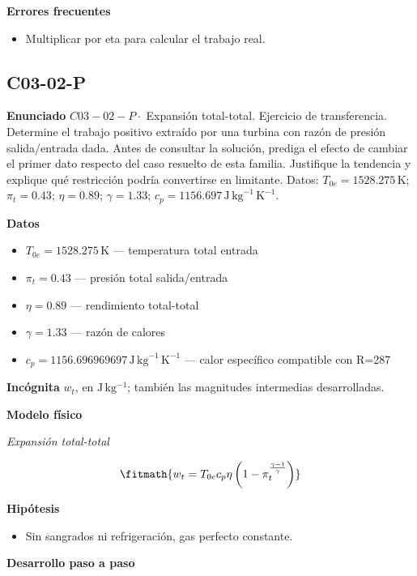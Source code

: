 \documentclass[10pt,openany]{book}
\begin{document}
\noindent\textbf{Errores frecuentes}
\begin{itemize}
\item Multiplicar por eta para calcular el trabajo real.
\end{itemize}
\subsection*{C03-02-P}

\noindent\textbf{Enunciado}
\(C03-02-P \cdot\) Expansión total-total. Ejercicio de transferencia. Determine el trabajo positivo extraído por una turbina con razón de presión salida/entrada dada. Antes de consultar la solución, prediga el efecto de cambiar el primer dato respecto del caso resuelto de esta familia. Justifique la tendencia y explique qué restricción podría convertirse en limitante. Datos: \(T_{0e}=1528.275\, \mathrm{K}\); \(\pi_t=0.43\); \(\eta=0.89\); \(\gamma=1.33\); \(c_p=1156.697\, \mathrm{J}\,\mathrm{kg}^{-1}\,\mathrm{K}^{-1}\).

\noindent\textbf{Datos}
\begin{itemize}
\item $T_{0e} = 1528.275\,\mathrm{K}$ — temperatura total entrada
\item $\pi_t = 0.43$ — presión total salida/entrada
\item $\eta = 0.89$ — rendimiento total-total
\item $\gamma = 1.33$ — razón de calores
\item $c_p = 1156.696969697\,\mathrm{J}\,\mathrm{kg}^{-1}\,\mathrm{K}^{-1}$ — calor específico compatible con R=287
\end{itemize}

\noindent\textbf{Incógnita}
$w_t$, en $\mathrm{J\,kg^{-1}}$; también las magnitudes intermedias desarrolladas.

\noindent\textbf{Modelo físico}

\noindent\textit{Expansión total-total}

\[
\fitmath{w_t=T_{0e} c_p \eta \left(1 - \pi_t^{\frac{\gamma - 1}{\gamma}}\right)}
\]

\noindent\textbf{Hipótesis}
\begin{itemize}
\item Sin sangrados ni refrigeración, gas perfecto constante.
\end{itemize}

\noindent\textbf{Desarrollo paso a paso}
\end{document}
